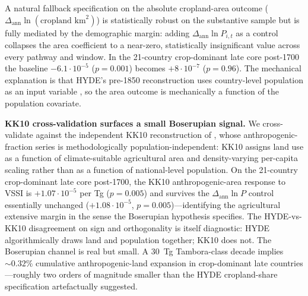 \documentclass[11pt,letterpaper]{article}
\begin{document}
A natural fallback specification on the absolute cropland-area outcome ($\Delta_{\text{ann}} \ln(\text{cropland km}^2)$) is statistically robust on the substantive sample but is fully mediated by the demographic margin: adding $\Delta_{\text{ann}} \ln P_{i,t}$ as a control collapses the area coefficient to a near-zero, statistically insignificant value across every pathway and window. In the 21-country crop-dominant late core post-1700 the baseline $-6.1\!\cdot\!10^{-5}$ ($p=0.001$) becomes $+8\!\cdot\!10^{-7}$ ($p=0.96$). The mechanical explanation is that HYDE's pre-1850 reconstruction uses country-level population as an input variable \citep{goldewijk2017}, so the area outcome is mechanically a function of the population covariate.

\medskip\noindent\textbf{KK10 cross-validation surfaces a small Boserupian signal.} We cross-validate against the independent KK10 reconstruction of \citet{kaplan2011}, whose anthropogenic-fraction series is methodologically population-independent: KK10 assigns land use as a function of climate-suitable agricultural area and density-varying per-capita scaling rather than as a function of national-level population. On the 21-country crop-dominant late core post-1700, the KK10 anthropogenic-area response to VSSI is $+1.07\!\cdot\!10^{-5}$ per Tg ($p=0.005$) and survives the $\Delta_{\text{ann}} \ln P$ control essentially unchanged ($+1.08\!\cdot\!10^{-5}$, $p=0.005$)---identifying the agricultural extensive margin in the sense the Boserupian hypothesis specifies. The HYDE-vs-KK10 disagreement on sign and orthogonality is itself diagnostic: HYDE algorithmically draws land and population together; KK10 does not. The Boserupian channel is real but small. A 30~Tg Tambora-class decade implies $\sim 0.32\%$ cumulative anthropogenic-land expansion in crop-dominant late countries---roughly two orders of magnitude smaller than the HYDE cropland-share specification artefactually suggested.
\end{document}
